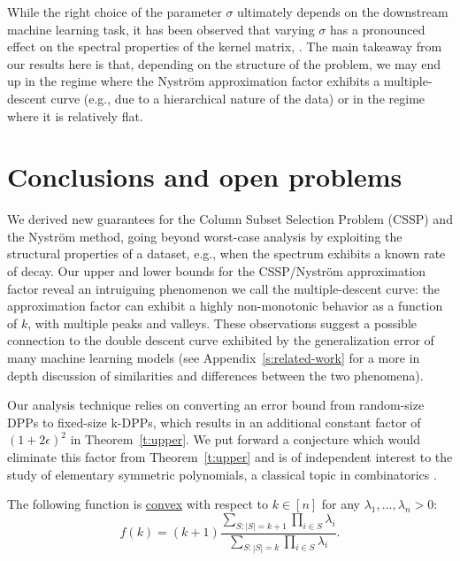 \documentclass{article}
\begin{document}
While the right choice of the parameter $\sigma$ ultimately depends on
the downstream machine learning task, it has been observed that
varying $\sigma$ has a pronounced effect on the spectral properties of
the kernel matrix, \citep[see,
e.g.,][]{revisiting-nystrom,LBM16_TR,wang2019block}.  
The main takeaway from our results here is that, depending on the
structure of the problem, we may end up in the regime where the
Nystr\"om approximation factor exhibits a multiple-descent curve
(e.g., due to a hierarchical nature of the data) or in the regime
where it is relatively flat.  


\section{Conclusions and open problems}
\label{s:conclusions}
We derived new guarantees for the Column Subset Selection Problem (CSSP) and
the Nystr\"om method, going beyond worst-case analysis by exploiting the
structural properties of a dataset, e.g., when the spectrum exhibits a
known rate of decay. Our upper and lower bounds
for the CSSP/Nystr\"om approximation factor reveal an intruiguing phenomenon we
call the multiple-descent curve: the approximation factor can exhibit a highly
non-monotonic behavior as a function of $k$, with multiple
peaks and valleys. These observations suggest a possible connection to the
double descent curve exhibited by
the generalization error of many machine learning models (see
Appendix~\ref{s:related-work} for a more in depth discussion of
similarities and differences between the two phenomena).

Our analysis technique relies on converting an error bound
from random-size DPPs to fixed-size k-DPPs, which results in an
additional constant factor of $(1+2\epsilon)^2$ in Theorem~\ref{t:upper}.
We put forward a
conjecture which would eliminate this factor from
Theorem~\ref{t:upper} and is of independent interest to the study of 
elementary symmetric polynomials, a classical topic in combinatorics
\citep{HLP-Inequalities}. 
\begin{conjecture}\label{c:convex}
  The following function is \underline{convex} with respect to $k\in[n]$ for any
$\lambda_1,...,\lambda_n> 0$:\vspace{-.5mm}
 \[f(k)=(k+1)\frac{\sum_{S:|S|=k+1}\prod_{i\in S}\lambda_i}{\sum_{S:|S|=k}\prod_{i\in S}\lambda_i}.\]
\end{conjecture} %
\end{document}
